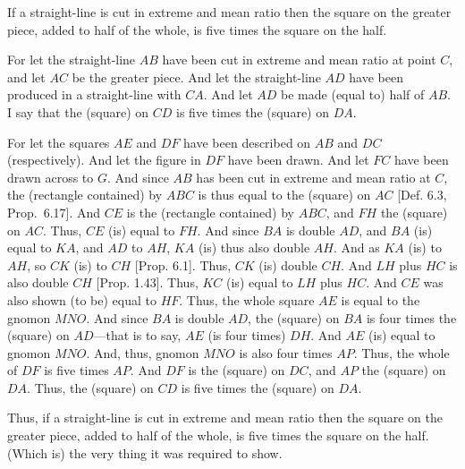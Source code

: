 \begin{Parallel}{}{}
{If a straight-line is cut in extreme and mean ratio then the square on the
greater piece, added to half of the whole, is  five times the square
on the half.

\epsfysize=2.5in
\centerline{}

For let the straight-line $AB$ have been cut in extreme and mean ratio at
point $C$, and let $AC$ be the greater piece. And let the straight-line
$AD$ have been produced in a straight-line with $CA$. And let
$AD$ be made (equal to) half of $AB$. I say that the (square) on
$CD$ is five times the (square) on $DA$. 

For let the squares $AE$ and $DF$ have been described on $AB$ and
$DC$ (respectively). And let the figure in $DF$ have been drawn.  
And let $FC$ have been drawn across to $G$. And since $AB$ has been
cut in extreme and mean ratio at $C$, the (rectangle
contained) by $ABC$ is thus equal to the (square) on $AC$ [Def. 6.3, Prop.~6.17].
And  $CE$ is the (rectangle contained) by $ABC$, and $FH$ the
(square) on $AC$. Thus, $CE$ (is) equal to $FH$. 
And since $BA$ is double $AD$, and $BA$ (is) equal to $KA$,
and $AD$ to $AH$, $KA$ (is) thus also double $AH$. 
And as $KA$ (is) to $AH$, so $CK$ (is) to $CH$ [Prop. 6.1].
Thus, $CK$ (is) double $CH$. And $LH$ plus $HC$ is also double $CH$
[Prop. 1.43].  Thus, $KC$ (is) equal to $LH$ plus $HC$. And
$CE$ was also shown (to be) equal to $HF$. Thus, the whole square
$AE$ is equal to the gnomon $MNO$. And since $BA$ is double
$AD$, the (square) on $BA$ is four times the (square) on $AD$---that
is to say, $AE$ (is four times) $DH$. And $AE$ (is) equal to
gnomon $MNO$. And, thus, gnomon $MNO$ is also four times $AP$. 
Thus, the whole of $DF$ is five times $AP$. And $DF$ is the (square)
on $DC$, and $AP$ the (square) on $DA$. Thus, the
(square) on $CD$ is five times the (square) on $DA$. 

Thus, if a straight-line is cut in extreme and mean ratio then the square on the
greater piece, added to half of the whole, is five times the square
on the half. (Which is) the very thing it was required to show.}
\end{Parallel}

